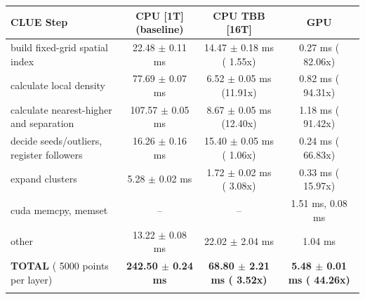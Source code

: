     \begin{tabular}{l|c|c|c}
    \hline
    CLUE Step                                 & CPU [1T] (baseline)         & CPU TBB [16T]                         & GPU                       \\ \hline
    build fixed-grid spatial index            &  22.48 $\pm$  0.11 ms       &  14.47 $\pm$  0.18 ms ( 1.55x)        &   0.27 ms ( 82.06x)       \\
    calculate local density                   &  77.69 $\pm$  0.07 ms       &   6.52 $\pm$  0.05 ms (11.91x)        &   0.82 ms ( 94.31x)       \\
    calculate nearest-higher and separation   & 107.57 $\pm$  0.05 ms       &   8.67 $\pm$  0.05 ms (12.40x)        &   1.18 ms ( 91.42x)       \\
    decide seeds/outliers, register followers &  16.26 $\pm$  0.16 ms       &  15.40 $\pm$  0.05 ms ( 1.06x)        &   0.24 ms ( 66.83x)       \\
    expand clusters                           &   5.28 $\pm$  0.02 ms       &   1.72 $\pm$  0.02 ms ( 3.08x)        &   0.33 ms ( 15.97x)       \\ \hline
    cuda memcpy, memset                       & --                          & --                                    &   1.51 ms,   0.08 ms      \\
    other                                     &  13.22 $\pm$  0.08 ms       &  22.02 $\pm$  2.04 ms                 &   1.04 ms                 \\ \hline
    \textbf{TOTAL} ( 5000 points per layer)   & \textbf{242.50 $\pm$  0.24 ms} & \textbf{ 68.80 $\pm$  2.21 ms ( 3.52x)} & \textbf{  5.48 $\pm$  0.01 ms ( 44.26x)}  \\
    \hline
    \multicolumn{4}{c}{}
    \end{tabular}
    \linebreak


